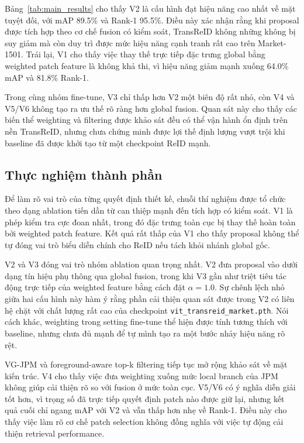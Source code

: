 Bảng~\ref{tab:main_results} cho thấy V2 là cấu hình đạt hiệu năng cao nhất về mặt tuyệt đối, với mAP 89.5\% và Rank-1 95.5\%. Điều này xác nhận rằng khi proposal được tích hợp theo cơ chế fusion có kiểm soát, TransReID không những không bị suy giảm mà còn duy trì được mức hiệu năng cạnh tranh rất cao trên Market-1501. Trái lại, V1 cho thấy việc thay thế trực tiếp đặc trưng global bằng weighted patch feature là không khả thi, vì hiệu năng giảm mạnh xuống 64.0\% mAP và 81.8\% Rank-1.

Trong cùng nhóm fine-tune, V3 chỉ thấp hơn V2 một biên độ rất nhỏ, còn V4 và V5/V6 không tạo ra ưu thế rõ ràng hơn global fusion. Quan sát này cho thấy các biến thể weighting và filtering được khảo sát đều có thể vận hành ổn định trên nền TransReID, nhưng chưa chứng minh được lợi thế định lượng vượt trội khi baseline đã được khởi tạo từ một checkpoint ReID mạnh.

\subsection{Thực nghiệm thành phần}

Để làm rõ vai trò của từng quyết định thiết kế, chuỗi thí nghiệm được tổ chức theo dạng ablation tiến dần từ can thiệp mạnh đến tích hợp có kiểm soát. V1 là phép kiểm tra cực đoan nhất, trong đó đặc trưng toàn cục bị thay thế hoàn toàn bởi weighted patch feature. Kết quả rất thấp của V1 cho thấy proposal không thể tự đóng vai trò biểu diễn chính cho ReID nếu tách khỏi nhánh global gốc.

V2 và V3 đóng vai trò nhóm ablation quan trọng nhất. V2 đưa proposal vào dưới dạng tín hiệu phụ thông qua global fusion, trong khi V3 gần như triệt tiêu tác động trực tiếp của weighted feature bằng cách đặt \(\alpha = 1.0\). Sự chênh lệch nhỏ giữa hai cấu hình này hàm ý rằng phần cải thiện quan sát được trong V2 có liên hệ chặt với chất lượng rất cao của checkpoint \texttt{vit\_transreid\_market.pth}. Nói cách khác, weighting trong setting fine-tune thể hiện được tính tương thích với baseline, nhưng chưa đủ mạnh để tự mình tạo ra một bước nhảy hiệu năng rõ rệt.

VG-JPM và foreground-aware top-k filtering tiếp tục mở rộng khảo sát về mặt kiến trúc. V4 cho thấy việc đưa weighting xuống mức local branch của JPM không giúp cải thiện rõ so với fusion ở mức toàn cục. V5/V6 có ý nghĩa diễn giải tốt hơn, vì trọng số đã trực tiếp quyết định patch nào được giữ lại, nhưng kết quả cuối chỉ ngang mAP với V2 và vẫn thấp hơn nhẹ về Rank-1. Điều này cho thấy việc làm rõ cơ chế patch selection không đồng nghĩa với việc tự động cải thiện retrieval performance.

